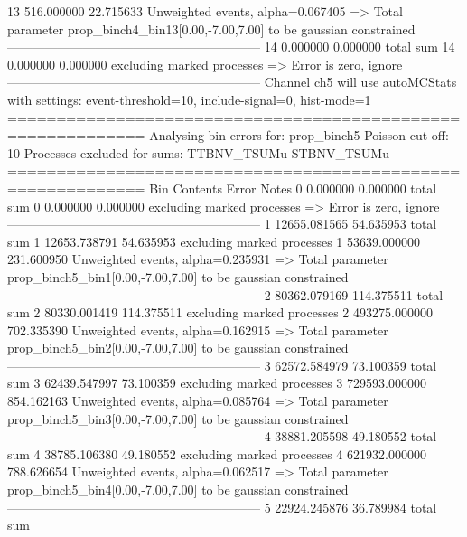 13         516.000000      22.715633       Unweighted events, alpha=0.067405
  => Total parameter prop_binch4_bin13[0.00,-7.00,7.00] to be gaussian constrained
------------------------------------------------------------
14         0.000000        0.000000        total sum                     
14         0.000000        0.000000        excluding marked processes    
  => Error is zero, ignore      
------------------------------------------------------------
Channel ch5 will use autoMCStats with settings: event-threshold=10, include-signal=0, hist-mode=1
============================================================
Analysing bin errors for: prop_binch5
Poisson cut-off: 10
Processes excluded for sums: TTBNV_TSUMu STBNV_TSUMu
============================================================
Bin        Contents        Error           Notes                         
0          0.000000        0.000000        total sum                     
0          0.000000        0.000000        excluding marked processes    
  => Error is zero, ignore      
------------------------------------------------------------
1          12655.081565    54.635953       total sum                     
1          12653.738791    54.635953       excluding marked processes    
1          53639.000000    231.600950      Unweighted events, alpha=0.235931
  => Total parameter prop_binch5_bin1[0.00,-7.00,7.00] to be gaussian constrained
------------------------------------------------------------
2          80362.079169    114.375511      total sum                     
2          80330.001419    114.375511      excluding marked processes    
2          493275.000000   702.335390      Unweighted events, alpha=0.162915
  => Total parameter prop_binch5_bin2[0.00,-7.00,7.00] to be gaussian constrained
------------------------------------------------------------
3          62572.584979    73.100359       total sum                     
3          62439.547997    73.100359       excluding marked processes    
3          729593.000000   854.162163      Unweighted events, alpha=0.085764
  => Total parameter prop_binch5_bin3[0.00,-7.00,7.00] to be gaussian constrained
------------------------------------------------------------
4          38881.205598    49.180552       total sum                     
4          38785.106380    49.180552       excluding marked processes    
4          621932.000000   788.626654      Unweighted events, alpha=0.062517
  => Total parameter prop_binch5_bin4[0.00,-7.00,7.00] to be gaussian constrained
------------------------------------------------------------
5          22924.245876    36.789984       total sum                     
